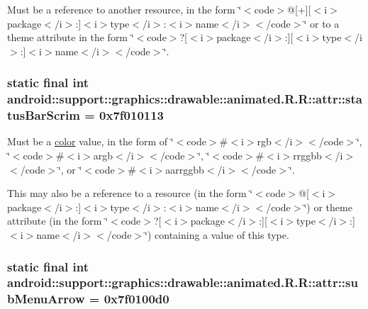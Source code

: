 Must be a reference to another resource, in the form \char`\"{}$<$code$>$@\mbox{[}+\mbox{]}\mbox{[}$<$i$>$package$<$/i$>$:\mbox{]}$<$i$>$type$<$/i$>$:$<$i$>$name$<$/i$>$$<$/code$>$\char`\"{} or to a theme attribute in the form \char`\"{}$<$code$>$?\mbox{[}$<$i$>$package$<$/i$>$:\mbox{]}\mbox{[}$<$i$>$type$<$/i$>$:\mbox{]}$<$i$>$name$<$/i$>$$<$/code$>$\char`\"{}. \hypertarget{classandroid_1_1support_1_1graphics_1_1drawable_1_1animated_1_1_r_1_1attr_6c8bc17a4d47cd8c4bcc145b61083515}{
\subsubsection[{statusBarScrim}]{\setlength{\rightskip}{0pt plus 5cm}static final int android::support::graphics::drawable::animated.R.R::attr::statusBarScrim = 0x7f010113}}
\label{classandroid_1_1support_1_1graphics_1_1drawable_1_1animated_1_1_r_1_1attr_6c8bc17a4d47cd8c4bcc145b61083515}


Must be a \hyperlink{classandroid_1_1support_1_1graphics_1_1drawable_1_1animated_1_1_r_1_1color}{color} value, in the form of \char`\"{}$<$code$>$\#$<$i$>$rgb$<$/i$>$$<$/code$>$\char`\"{}, \char`\"{}$<$code$>$\#$<$i$>$argb$<$/i$>$$<$/code$>$\char`\"{}, \char`\"{}$<$code$>$\#$<$i$>$rrggbb$<$/i$>$$<$/code$>$\char`\"{}, or \char`\"{}$<$code$>$\#$<$i$>$aarrggbb$<$/i$>$$<$/code$>$\char`\"{}. 

This may also be a reference to a resource (in the form \char`\"{}$<$code$>$@\mbox{[}$<$i$>$package$<$/i$>$:\mbox{]}$<$i$>$type$<$/i$>$:$<$i$>$name$<$/i$>$$<$/code$>$\char`\"{}) or theme attribute (in the form \char`\"{}$<$code$>$?\mbox{[}$<$i$>$package$<$/i$>$:\mbox{]}\mbox{[}$<$i$>$type$<$/i$>$:\mbox{]}$<$i$>$name$<$/i$>$$<$/code$>$\char`\"{}) containing a value of this type. \hypertarget{classandroid_1_1support_1_1graphics_1_1drawable_1_1animated_1_1_r_1_1attr_c07d4287149154d797dd34d06c294722}{
\subsubsection[{subMenuArrow}]{\setlength{\rightskip}{0pt plus 5cm}static final int android::support::graphics::drawable::animated.R.R::attr::subMenuArrow = 0x7f0100d0}}
\label{classandroid_1_1support_1_1graphics_1_1drawable_1_1animated_1_1_r_1_1attr_c07d4287149154d797dd34d06c294722}


